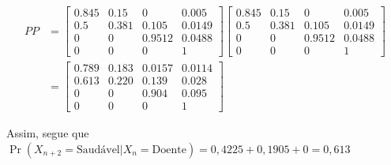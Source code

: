 \documentclass[12pt, a4paper, openany]{book}
\numberwithin{equation}{chapter}
\numberwithin{table}{chapter}
\numberwithin{figure}{chapter}
\theoremstyle{break}
\begin{document}



\begin{align*}
PP &= 
\begin{bmatrix*}
0.845 & 0.15  & 0     & 0.005 \\ 
0.5   & 0.381 & 0.105 & 0.0149 \\ 
0     & 0     & 0.9512 & 0.0488 \\ 
0     & 0     & 0     & 1
\end{bmatrix*}
\begin{bmatrix*}
0.845 & 0.15  & 0     & 0.005 \\ 
0.5   & 0.381 & 0.105 & 0.0149 \\ 
0     & 0     & 0.9512 & 0.0488 \\ 
0     & 0     & 0     & 1
\end{bmatrix*} \\[10pt]
&= 
\begin{bmatrix*}
0.789 & 0.183 & 0.0157 & 0.0114 \\ 
0.613 & 0.220 & 0.139  & 0.028  \\ 
0     & 0     & 0.904  & 0.095  \\ 
0     & 0     & 0      & 1
\end{bmatrix*}
\end{align*}








Assim, segue que  $\Pr(X_{n+2} = \text{Saudável} | X_n = \text{Doente}) = 0,4225+0,1905 + 0= 0,613$
\end{document}
